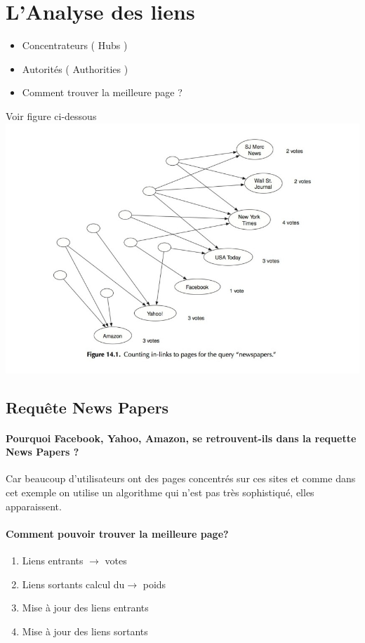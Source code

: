 \section{L’Analyse des liens}
\begin{itemize}
\item Concentrateurs ( Hubs )
\item Autorités ( Authorities )
\item Comment trouver la meilleure page ?
\end{itemize}

Voir figure ci-dessous \\	

\includegraphics[scale=0.5]{images/ref/fig-14-1.jpeg}
\subsection{Requête News Papers}

\paragraph{Pourquoi Facebook, Yahoo, Amazon, se retrouvent-ils dans la requette News Papers ?}
Car beaucoup d'utilisateurs ont des pages concentrés sur ces sites et comme dans cet exemple on utilise un algorithme qui n'est pas très sophistiqué, elles apparaissent. 

\paragraph{Comment pouvoir trouver la meilleure page?}
\begin{enumerate}
\item Liens entrants $ \rightarrow $ votes
\item  Liens sortants  calcul du$ \rightarrow$  poids
\item Mise à jour des liens entrants
\item Mise à jour des liens sortants 
\end{enumerate}


